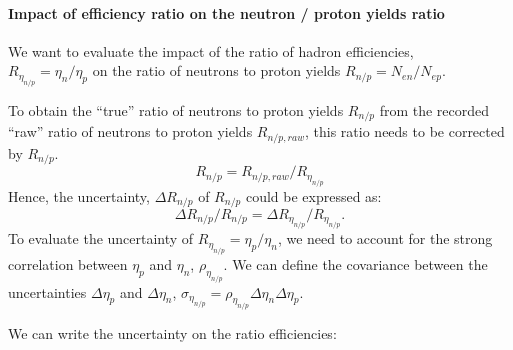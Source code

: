 \paragraph{Impact of efficiency ratio on the neutron / proton yields ratio}

{\hskip 0.7cm}We want to evaluate the impact of the ratio of hadron efficiencies,\\
$R_{\eta_{n/p}} = \eta_n/\eta_p$
on the ratio of neutrons to proton yields $R_{n/p} = N_{en}/N_{ep}$.

To obtain the ``true'' ratio of neutrons to proton yields $R_{n/p}$ from the recorded ``raw''
ratio of neutrons to proton yields $R_{n/p, raw}$,
this ratio needs to be corrected by $R_{n/p}$.
%
\begin{equation}
  R_{n/p} = R_{n/p, raw}/R_{\eta_{n/p}}
\end{equation}
%
Hence, the uncertainty, $\Delta R_{n/p}$ of $R_{n/p}$ could be expressed as:
%
\begin{equation}
  \Delta R_{n/p}/R_{n/p} = \Delta R_{\eta_{n/p}}/R_{\eta_{n/p}}.
\end{equation}
%
To evaluate the uncertainty of $R_{\eta_{n/p}} = \eta_p/\eta_n$,
we need to account for the strong correlation between $\eta_p$ and $\eta_n$, $\rho_{\eta_{n/p}}$. 
We can define the covariance between the uncertainties $\Delta \eta_p$ and $\Delta \eta_n$,
$\sigma_{\eta_{n/p}} = \rho_{\eta_{n/p}} \Delta \eta_{n} \Delta \eta_{p}$.

We can write the uncertainty on the ratio efficiencies:

